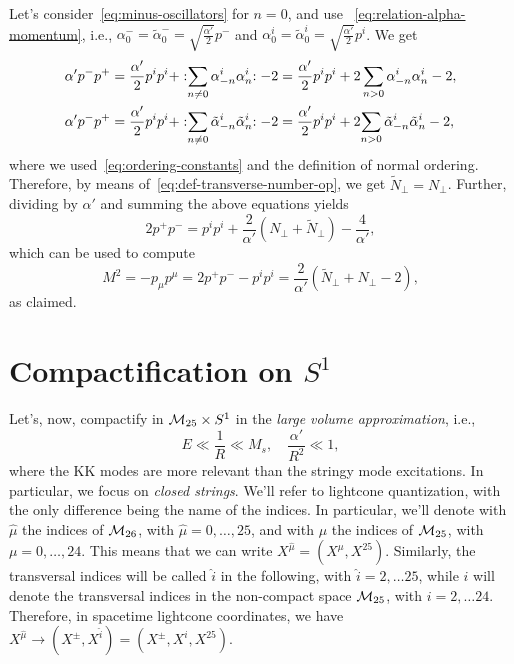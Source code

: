 \begin{mdframed}
\begin{innerproof}
    Let's consider~\eqref{eq:minus-oscillators} for $n=0$, and use ~\eqref{eq:relation-alpha-momentum}, i.e., $\alpha^-_0 = \tilde{\alpha}^-_0 = \sqrt{\frac{\alpha'}{2}} p^-$ and $\alpha^i_0 = \tilde{\alpha}^i_0 = \sqrt{\frac{\alpha'}{2}}p^i$. We get
    \begin{equation}
    \begin{aligned}
        \alpha' p^- p^+ &= \frac{\alpha'}{2} p^i p^i + :\mathrel{\sum_{n\neq0} \alpha^i_{-n} \alpha^i_n}: - 2 = \frac{\alpha'}{2} p^i p^i + 2 \sum_{n>0} \alpha^i_{-n} \alpha^i_n - 2, \\
        \alpha' p^- p^+ &= \frac{\alpha'}{2} p^i p^i + :\mathrel{\sum_{n\neq0} \tilde{\alpha}^i_{-n} \tilde{\alpha}^i_n}: - 2 = \frac{\alpha'}{2} p^i p^i + 2{\sum_{n>0} \tilde{\alpha}^i_{-n} \tilde{\alpha}^i_n} - 2 ,\\
    \end{aligned}
    \end{equation}
    where we used~\eqref{eq:ordering-constants} and the definition of normal ordering. Therefore, by means of~\eqref{eq:def-transverse-number-op}, we get $\tilde{N}_\perp = N_\perp$. Further, dividing by $\alpha'$ and summing the above equations yields
    \begin{equation}
        2 p^+ p^- = p^i p^i + \frac{2}{\alpha'} (N_\perp + \tilde{N}_\perp) - \frac{4}{\alpha'},
    \end{equation}
    which can be used to compute
    \begin{equation}
        M^2 = - p_\mu p^\mu = 2p^+ p^- - p^i p^i = \frac{2}{\alpha'} (\tilde{N}_\perp + N_\perp - 2),
    \end{equation}
    as claimed.
\end{innerproof}
\end{mdframed}

\section{Compactification on \texorpdfstring{$S^1$}{S1}}
Let's, now, compactify in $\mathcal{M}_{25} \times S^1$ in the \emph{large volume approximation}, i.e.,
\begin{equation}\label{eq:large-volume-approx}
    E \ll \frac{1}{R} \ll M_s, \quad \frac{\alpha'}{R^2} \ll 1,
\end{equation}
where the KK modes are more relevant than the stringy mode excitations. In particular, we focus on \emph{closed strings}. We'll refer to lightcone quantization, with the only difference being the name of the indices. In particular, we'll denote with $\hat{\mu}$ the indices of $\mathcal{M}_{26}$, with $\hat{\mu} = 0, \dots, 25$, and with $\mu$ the indices of $\mathcal{M}_{25}$, with $\mu = 0, \dots , 24$. This means that we can write $X^{\hat{\mu}} = (X^\mu, X^{25})$. Similarly, the transversal indices will be called $\hat{i}$ in the following, with $\hat{i} = 2, \dots 25$, while $i$ will denote the transversal indices in the non-compact space $\mathcal{M}_{25}$, with $i = 2, \dots 24$. Therefore, in spacetime lightcone coordinates, we have $X^{\hat{\mu}} \to (X^\pm, X^{\hat{i}}) = (X^\pm, X^i, X^{25})$.

